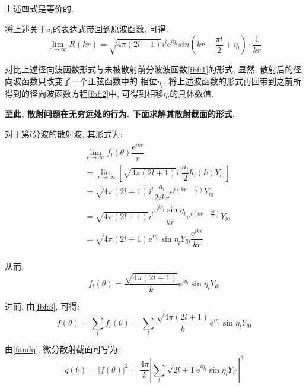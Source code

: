 \documentclass[a4paper, 11pt]{article}
\begin{document}
\begin{spacing}{1.2}
          上述四式是等价的. 

          将上述关于$a_l$的表达式带回到原波函数, 可得:  
          \begin{equation}
              \lim_{r\to\infty}R(kr) = %
              \sqrt{4\pi(2l+1)}i^l\mathrm{e}^{i\eta_l}sin(kr-\frac{\pi{}l}{2}+\eta_l)\cdot\frac{1}{kr}
          \end{equation}

          对比上述径向波函数形式与未被散射前分波波函数\eqref{fbf:1}的形式, 显然, 散射后的径向波函数只改变了一个正弦函数中的
          相位$\eta_l$. 将上述波函数的形式再回带到之前所得到的径向波函数方程\eqref{fbf:2}中, 可得到相移$\eta_l$的具体数值.

          \textbf{至此, 散射问题在无穷远处的行为. 下面求解其散射截面的形式.}

          对于第$l$分波的散射波, 其形式为:
          \begin{equation}
            \begin{aligned}
              &\lim_{r\to\infty}f_l(\theta)\dfrac{\mathrm{e}^{ikr}}{r}\\
              &=\lim_{r\to\infty}\left[\sqrt{4\pi(2l+1)}i^l\dfrac{a_l}{2}h_l(k)Y_{l0}\right]\\
              &= \sqrt{4\pi(2l+1)}i^l\dfrac{a_l}{2ikr}\mathrm{e}^{i(kr-\frac{\pi{}l}{2})}Y_{l0} \\
              &= \sqrt{4\pi(2l+1)}i^l\dfrac{\mathrm{e}^{i\eta_l}\sin\eta_l}{kr}\mathrm{e}^{i(kr-\frac{\pi{}l}{2})}Y_{l0} \\
              &= \sqrt{4\pi(2l+1)}\mathrm{e}^{i\eta_l}\sin\eta_lY_{l0}\dfrac{\mathrm{e}^{ikr}}{kr} \\ 
            \end{aligned}
          \end{equation}

          从而,
          \begin{equation}
            f_l(\theta) = \dfrac{\sqrt{4\pi(2l+1)}}{k}\mathrm{e}^{i\eta_l}\sin\eta_lY_{l0}
          \end{equation}

          进而, 由\eqref{fbf:3}, 可得:
          \begin{equation}
            f(\theta) = \sum_lf_l(\theta) %
            = \sum_l\dfrac{\sqrt{4\pi(2l+1)}}{k}\mathrm{e}^{i\eta_l}\sin\eta_lY_{l0}
          \end{equation}

          由\eqref{fandq}, 微分散射截面可写为:
          \begin{equation}
            q(\theta) = |f(\theta)|^2 = \dfrac{4\pi}{k}%
             \left|\sum_l\sqrt{2l+1}\mathrm{e}^{i\eta_l}\sin\eta_lY_{l0}\right|^2
          \end{equation}


\end{spacing}
\end{document}
